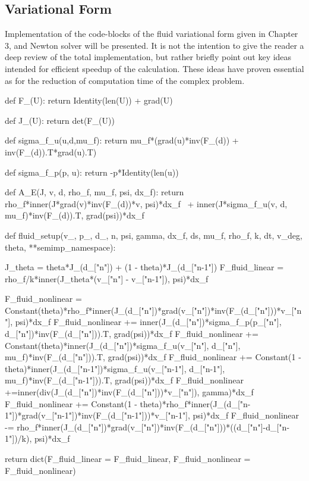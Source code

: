 \subsection{Variational Form}
Implementation of the code-blocks of the fluid variational form given in Chapter 3, and Newton solver will be presented. It is not the intention to give the reader a deep review of the total implementation, but rather briefly point out key ideas intended for efficient speedup of the calculation. These ideas have proven essential as for the reduction of computation time of the complex problem.

\begin{python}[caption=thetaCN.py]
def F_(U):
	return Identity(len(U)) + grad(U)

def J_(U):
	return det(F_(U))

def sigma_f_u(u,d,mu_f):
    return  mu_f*(grad(u)*inv(F_(d)) + inv(F_(d)).T*grad(u).T)

def sigma_f_p(p, u):
    return -p*Identity(len(u))

def A_E(J, v, d, rho_f, mu_f, psi, dx_f):
    return rho_f*inner(J*grad(v)*inv(F_(d))*v, psi)*dx_f \
        + inner(J*sigma_f_u(v, d, mu_f)*inv(F_(d)).T, grad(psi))*dx_f


def fluid_setup(v_, p_, d_, n, psi, gamma, dx_f, ds, mu_f, rho_f, k, dt, v_deg, theta, **semimp_namespace):

	J_theta = theta*J_(d_["n"]) + (1 - theta)*J_(d_["n-1"])
	F_fluid_linear = rho_f/k*inner(J_theta*(v_["n"] - v_["n-1"]), psi)*dx_f

	F_fluid_nonlinear =  Constant(theta)*rho_f*inner(J_(d_["n"])*grad(v_["n"])*inv(F_(d_["n"]))*v_["n"], psi)*dx_f
	F_fluid_nonlinear += inner(J_(d_["n"])*sigma_f_p(p_["n"], d_["n"])*inv(F_(d_["n"])).T, grad(psi))*dx_f
	F_fluid_nonlinear += Constant(theta)*inner(J_(d_["n"])*sigma_f_u(v_["n"], d_["n"], mu_f)*inv(F_(d_["n"])).T, grad(psi))*dx_f
	F_fluid_nonlinear += Constant(1 - theta)*inner(J_(d_["n-1"])*sigma_f_u(v_["n-1"], d_["n-1"], mu_f)*inv(F_(d_["n-1"])).T, grad(psi))*dx_f
	F_fluid_nonlinear +=inner(div(J_(d_["n"])*inv(F_(d_["n"]))*v_["n"]), gamma)*dx_f
	F_fluid_nonlinear += Constant(1 - theta)*rho_f*inner(J_(d_["n-1"])*grad(v_["n-1"])*inv(F_(d_["n-1"]))*v_["n-1"], psi)*dx_f
	F_fluid_nonlinear -= rho_f*inner(J_(d_["n"])*grad(v_["n"])*inv(F_(d_["n"]))*((d_["n"]-d_["n-1"])/k), psi)*dx_f

	return dict(F_fluid_linear = F_fluid_linear, F_fluid_nonlinear = F_fluid_nonlinear)
\end{python}

